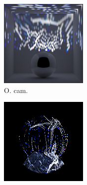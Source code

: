 \begin{figure}[]
\begin{subfigure}{\textwidth}
\begin{subfigure}{0.19\textwidth}
        \end{subfigure}
        \hfill
        \begin{subfigure}{0.19\textwidth}
            \centering
            \includegraphics[width=\textwidth]{images/04-experiment03/ball_dof/marble/stats_proj.jpg}
            \caption{O. cam.}
            \label{fig:ex03-ball_dof-marble-stats_proj}
        \end{subfigure}
        \hfill
        \begin{subfigure}{0.19\textwidth}
            \centering
            \includegraphics[width=\textwidth]{images/04-experiment03/ball_dof/marble/pixel_im.jpg}

\end{subfigure}
\end{subfigure}
\end{figure}
